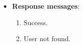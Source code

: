 \begin{itemize}
\begin{itemize}
\begin{itemize}
            \begin{spverbatim}
            {
                "errorMessage": "string",
                "errorDetails": "string",
                "statusCode": 0,
                "success": true
            }
            \end{spverbatim}
        \end{itemize}
        \item \textbf{Response messages}:
        \begin{enumerate}
            \item Success.
            \item User not found.
        \end{enumerate}
    \end{itemize}
\end{itemize}